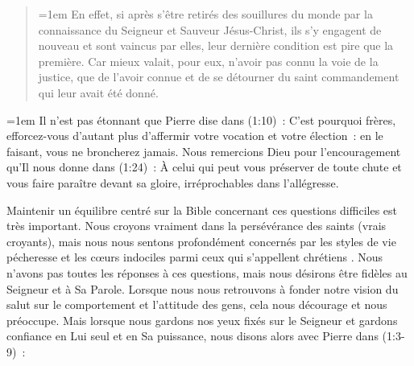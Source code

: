 \pocketpagebreak

\begin{quote}
\begin{pocketpar}{\emergencystretch=1em}
 \Og En effet, si après s'être retirés
 des souil\-lures du monde par la connaissance du Seigneur et Sauveur Jésus-Christ,
 ils s'y engagent de nouveau et sont vaincus par elles, leur dernière condition
 est pire que la première.
 Car mieux valait, pour eux, n'avoir pas connu la voie de la justice,
 que de l'avoir connue et de se détourner du saint commandement
 qui leur avait été donné. \Fg{}
\end{pocketpar}
\end{quote}

\begin{digestpar}{\BRallowhypbch}
\begin{pocketpar}{\emergencystretch=1em}
Il n'est pas étonnant que Pierre dise dans (1:10)~:
 \Og C'est pourquoi frères, efforcez-vous d'autant plus d'affermir
 votre vocation et votre élection~: en le faisant, vous ne broncherez jamais. \Fg{}
Nous remercions Dieu pour l'encouragement qu'Il nous donne dans (1:24)~:
 \Og À celui qui peut vous préserver de toute chute et vous faire paraître
 devant sa gloire, irréprochables dans l'allégresse. \Fg{}
\end{pocketpar}
\end{digestpar}

\begin{pocketpar}{}
Maintenir un équilibre centré sur la Bible concernant ces questions difficiles est très important.
 Nous croyons vraiment dans la persévérance des saints (vrais croyants),
 mais nous nous sentons profondément concernés par les styles de vie pécheresse
 et les cœurs indociles parmi ceux qui s'appellent \Og chrétiens \Fg{}.
 Nous n'avons pas toutes les réponses à ces questions,
 mais nous désirons être fidèles au Seigneur et à Sa Parole.
 Lorsque nous nous retrouvons à fonder notre vision du salut
 sur le comportement et l'attitude des gens, cela nous
 décourage et nous préoccupe.
 Mais lorsque nous gardons nos yeux fixés sur le Seigneur et gardons confiance en Lui seul
 et en Sa puissance, nous disons alors avec Pierre dans
 (1:3-9)~:
\end{pocketpar}

